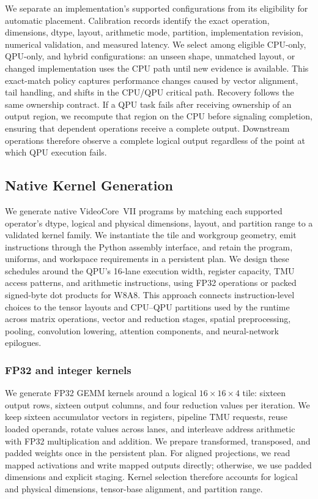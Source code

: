 \documentclass[sigplan,screen,review]{acmart}
\begin{document}
We separate an implementation's supported configurations from its eligibility for automatic placement. Calibration records identify the exact operation, dimensions, dtype, layout, arithmetic mode, partition, implementation revision, numerical validation, and measured latency. We select among eligible CPU-only, QPU-only, and hybrid configurations: an unseen shape, unmatched layout, or changed implementation uses the CPU path until new evidence is available. This exact-match policy captures performance changes caused by vector alignment, tail handling, and shifts in the CPU/QPU critical path. Recovery follows the same ownership contract. If a QPU task fails after receiving ownership of an output region, we recompute that region on the CPU before signaling completion, ensuring that dependent operations receive a complete output. Downstream operations therefore observe a complete logical output regardless of the point at which QPU execution fails.


\subsection{Native Kernel Generation}
\label{sec:kernels}

We generate native VideoCore~VII programs by matching each supported operator's dtype, logical and physical dimensions, layout, and partition range to a validated kernel family. We instantiate the tile and workgroup geometry, emit instructions through the Python assembly interface, and retain the program, uniforms, and workspace requirements in a persistent plan. We design these schedules around the QPU's 16-lane execution width, register capacity, TMU access patterns, and arithmetic instructions, using FP32 operations or packed signed-byte dot products for W8A8. This approach connects instruction-level choices to the tensor layouts and CPU--QPU partitions used by the runtime across matrix operations, vector and reduction stages, spatial preprocessing, pooling, convolution lowering, attention components, and neural-network epilogues.

\subsubsection{FP32 and integer kernels}

We generate FP32 GEMM kernels around a logical $16\times16\times4$ tile: sixteen output rows, sixteen output columns, and four reduction values per iteration. We keep sixteen accumulator vectors in registers, pipeline TMU requests, reuse loaded operands, rotate values across lanes, and interleave address arithmetic with FP32 multiplication and addition. We prepare transformed, transposed, and padded weights once in the persistent plan. For aligned projections, we read mapped activations and write mapped outputs directly; otherwise, we use padded dimensions and explicit staging. Kernel selection therefore accounts for logical and physical dimensions, tensor-base alignment, and partition range. 
\end{document}

